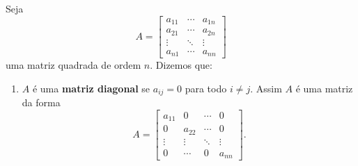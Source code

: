 \begin{definicao}
    Seja
    \[
        A = \begin{bmatrix}
                a_{11} & \cdots & a_{1n}\\
                a_{21} & \cdots & a_{2n}\\
                \vdots & \ddots & \vdots\\
                a_{n1} & \cdots & a_{nn}
            \end{bmatrix}
    \]
    uma matriz quadrada de ordem $n$. Dizemos que:
    \begin{enumerate}
        \item $A$ é uma \textbf{matriz diagonal} se $a_{ij} = 0$ para todo $i \ne j$. Assim $A$ é uma matriz da forma
            \[
                A = \begin{bmatrix}
                    a_{11} & 0 & \cdots & 0\\
                    0 & a_{22} & \cdots & 0\\
                    \vdots & \vdots & \ddots & \vdots\\
                    0 & \cdots & 0 & a_{nn}
                \end{bmatrix}.
            \]


\end{enumerate}
\end{definicao}
